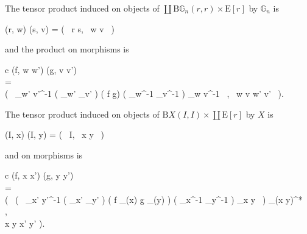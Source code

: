\documentclass{amsart} %
\newenvironment{eq*}{\begin{equation*}}{\end{equation*}}
\begin{document}
\begin{cor}\label{tenscor} The tensor product induced on objects of $\coprod \mathrm{B}\mathbb{G}_n(r, r) \times \mathrm{E}[r]$ by $\mathbb{G}_n$ is
\begin{eq*} (r, w) \otimes (s, v) = ( \, r \boxtimes s, \, w \otimes v \, ) \end{eq*}
and the product on morphisms is
\begin{eq*} \begin{array}{c}
		(f, w \to w') \otimes (g, v \to v') \\
		= \\
		\big( \, \rho_{w' \otimes v'}^{-1} \circ ( \rho_{w'} \otimes \rho_{v'} ) \circ ( f \otimes g) \circ ( \rho_{w}^{-1} \otimes \rho_{v}^{-1} ) \circ \rho_{w \otimes v}^{-1} \, , \, w \otimes v \to w' \otimes v' \, \big). 
		\end{array}
\end{eq*}
The tensor product induced on objects of $\mathrm{B}X(I,I) \times \coprod \mathrm{E}[r]$ by $X$ is
\begin{eq*} (I, x) \otimes (I, y) = ( \, I, \, x \otimes y \, ) \end{eq*}
and on morphisms is
\begin{eq*}\begin{array}{c}
		(f, x \to x') \otimes (g, y \to y') \\
		= \\
		\Big( \, \big( \, \rho_{x' \otimes y'}^{-1} \circ ( \rho_{x'} \otimes \rho_{y'} ) \circ ( f \otimes {}_{(x)} \otimes g \otimes {}_{(y)} ) \circ ( \rho_{x}^{-1} \otimes \rho_{y}^{-1} ) \circ \rho_{x \otimes y} \, \big) \otimes {}_{(x \otimes y)^*} \, , \\
		\quad x \otimes y \to x' \otimes y' \Big).
		\end{array}
\end{eq*}
\end{cor}
\end{document}
